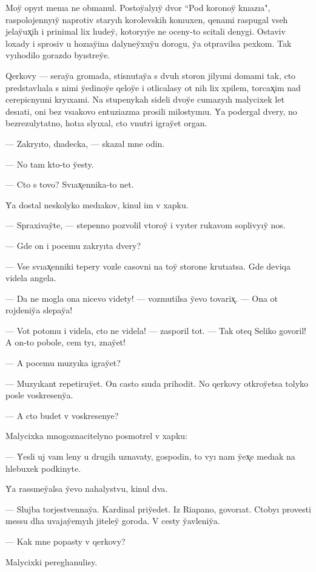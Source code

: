 \documentclass[10pt]{book}
\begin{document}
Moy̆ opyıt menıa ne obmanul. Postoy̆alyıy̆ dvor ``Pod koronoy̆ knıazıa", raspolojennyıy̆ naprotiv staryıh korolevskih konıuxen, qenami raspugal vseh jelay̆ux̨ih i prinimal lix lıudey̆, kotoryıy̆e ne oceny-to scitali denygi. Ostaviv loxady i sprosiv u hozıay̆ina dalyney̆xuy̆u dorogu, y̆a otpravilsa pexkom. Tak vyıhodilo gorazdo byıstrey̆e.

Qerkovy — seray̆a gromada, stisnutay̆a s dvuh storon jilyımi domami tak, cto predstavlıala s nimi y̆edinoy̆e qeloy̆e i otlicalasy ot nih lix xpilem, torcax̨im nad cerepicnyımi kryıxami. Na stupenykah sideli dvoy̆e cumazyıh malycixek let desıati, oni bez vsıakovo entuziazma prosili milostyınıu. Y̆a podergal dvery, no bezrezulytatno, hotıa slyıxal, cto vnutri igray̆et organ.

— Zakryıto, dıadecka, — skazal mne odin.

— No tam kto-to y̆esty.

— Cto s tovo? Svıax̨ennika-to net.

Y̆a dostal neskolyko medıakov, kinul im v xapku.

— Spraxivay̆te, — stepenno pozvolil vtoroy̆ i vyıter rukavom soplivyıy̆ nos.

— Gde on i pocemu zakryıta dvery?

— Vse svıax̨enniki tepery vozle casovni na toy̆ storone krutıatsa. Gde deviqa videla angela.

— Da ne mogla ona nicevo videty! — vozmutilsa y̆evo tovarix̨. — Ona ot rojdeniy̆a slepay̆a!

— Vot potomu i videla, cto ne videla! — zasporil tot. — Tak oteq Seliko govoril! A on-to pobole, cem tyı, znay̆et!

— A pocemu muzyıka igray̆et?

— Muzyıkant repetiruy̆et. On casto sıuda prihodit. No qerkovy otkroy̆etsa tolyko posle voskreseny̆a.

— A cto budet v voskresenye?

Malycixka mnogoznacitelyno posmotrel v xapku:

— Y̆esli uj vam leny u drugih uznavaty, gospodin, to vyı nam y̆ex̨e medıak na hlebuxek podkinyte.

Y̆a rassmey̆alsa y̆evo nahalystvu, kinul dva.

— Slujba torjestvennay̆a. Kardinal priy̆edet. Iz Riapano, govorıat. Ctobyı provesti messu dlıa uvajay̆emyıh jiteley̆ goroda. V cesty y̆avleniy̆a.

— Kak mne popasty v qerkovy?

Malycixki pereglıanulisy.
\end{document}
